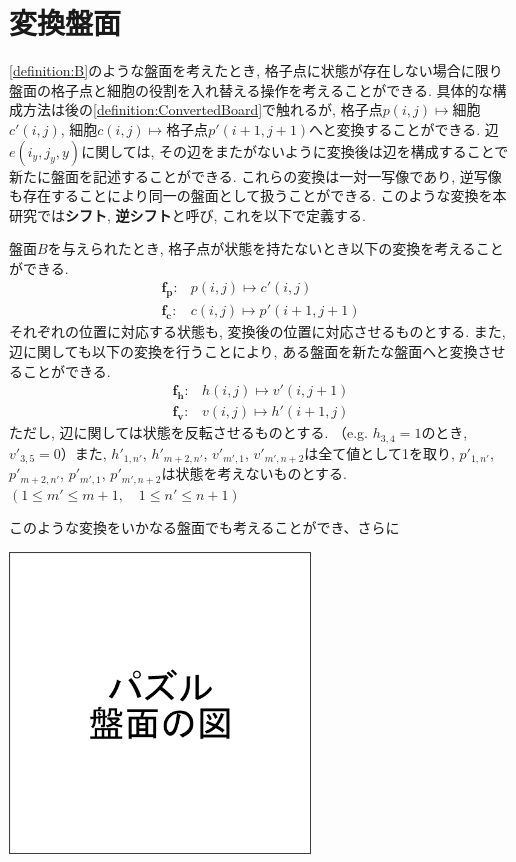 \section{変換盤面}\label{section:ConvertedBoard}
\cref{definition:B}のような盤面を考えたとき, 格子点に状態が存在しない場合に限り盤面の格子点と細胞の役割を入れ替える操作を考えることができる. 具体的な構成方法は後の\cref{definition:ConvertedBoard}で触れるが, 格子点$p(i,j)\mapsto$細胞$c'(i,j)$, 細胞$c(i,j)\mapsto$格子点$p'(i+1,j+1)$へと変換することができる. 辺$e(i_y,j_y,y)$に関しては, その辺をまたがないように変換後は辺を構成することで新たに盤面を記述することができる. これらの変換は一対一写像であり, 逆写像も存在することにより同一の盤面として扱うことができる. このような変換を本研究では\textbf{シフト}, \textbf{逆シフト}と呼び, これを以下で定義する.
\begin{definition}\label{definition:ConvertedBoard}
  盤面$B$を与えられたとき, 格子点が状態を持たないとき以下の変換を考えることができる.
  \begin{align*}
    \bm{f_p}\colon & p(i,j)  \longmapsto c'(i,j)     \\
    \bm{f_c}\colon & c(i,j)  \longmapsto p'(i+1,j+1)
  \end{align*}
  それぞれの位置に対応する状態も, 変換後の位置に対応させるものとする. また, 辺に関しても以下の変換を行うことにより, ある盤面を新たな盤面へと変換させることができる.
  \begin{align*}
    \bm{f_h}\colon & h(i,j)  \longmapsto v'(i,j+1) \\
    \bm{f_v}\colon & v(i,j)  \longmapsto h'(i+1,j)
  \end{align*}
  ただし, 辺に関しては状態を反転させるものとする. （e.g. $h_{3,4}=1$のとき, $v'_{3,5}=0$）また, $h'_{1,n'}$, $h'_{m+2,n'}$, $v'_{m',1}$, $v'_{m',n+2}$は全て値として1を取り, $p'_{1,n'}$, $p'_{m+2,n'}$, $p'_{m',1}$, $p'_{m',n+2}$は状態を考えないものとする. $(1\leq m' \leq m+1, \quad 1\leq n'\leq n+1)$

  このような変換をいかなる盤面でも考えることができ、さらに
\end{definition}




\begin{clearpagefigure}
  \includegraphics[width=8cm,clip]{fig/board.png}
  \caption{}
  \label{fig:Board}
\end{clearpagefigure}

